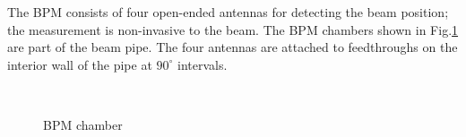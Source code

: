 \documentclass[english,review,number,sort&compress]{elsarticle}
\begin{document}
The BPM consists of four open-ended antennas for detecting the beam position; the measurement is non-invasive to the beam. The BPM chambers shown in Fig.\ref{fig:bpm-design-diagram} are part of the beam pipe. The four antennas are attached to feedthroughs on the interior wall of the pipe at $90^{\circ}$ intervals. 
\begin{figure}[tbph]
\begin{centering}
$\qquad$
\par\end{centering}

\protect\caption{\label{fig:bpm-design-diagram}BPM chamber}
\end{figure}
\end{document}
